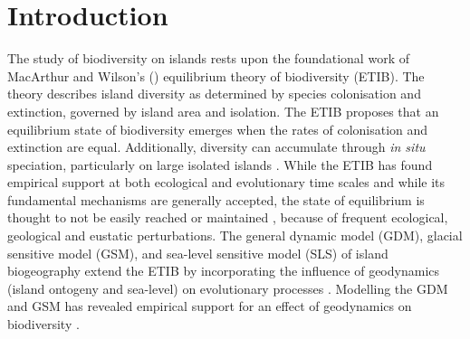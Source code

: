 \documentclass{article}
\begin{document}
\clearpage

\section*{Introduction}

The study of biodiversity on islands rests upon the foundational work of MacArthur and Wilson’s (\citeyear{macarthur_equilibrium_1963, macarthur_theory_1967}) equilibrium theory of biodiversity (ETIB). The theory describes island diversity as determined by species colonisation and extinction, governed by island area and isolation. The ETIB proposes that an equilibrium state of biodiversity emerges when the rates of colonisation and extinction are equal. Additionally, diversity can accumulate through \textit{in situ} speciation, particularly on large isolated islands \citep{macarthur_theory_1967, losos_analysis_2000, rosindell_unified_2011, valente_simple_2020}. While the ETIB has found empirical support at both ecological \citep{simberloff_experimental_1970} and evolutionary \citep{valente_equilibrium_2017, valente_simple_2020} time scales and while its fundamental mechanisms are generally accepted, the state of equilibrium is thought to not be easily reached or maintained \citep{heaney_dynamic_2000, whittaker_general_2008, valente_effects_2014, warren_islands_2015, fernandezpalacios_towards_2016, marshall_uncertain_2016}, because of frequent ecological, geological and eustatic perturbations. The general dynamic model (GDM), glacial sensitive model (GSM), and sea-level sensitive model (SLS) of island biogeography extend the ETIB by incorporating the influence of geodynamics (island ontogeny and sea-level) on evolutionary processes \citep{whittaker_general_2008, fernandezpalacios_towards_2016, avila_towards_2019}. Modelling the GDM and GSM has revealed empirical support for an effect of geodynamics on biodiversity \citep{whittaker_general_2008, bunnefeld_island_2012, steinbauer_re-evaluating_2013, rijsdijk_quantifying_2014, lim_true_2017}. \\
\end{document}
